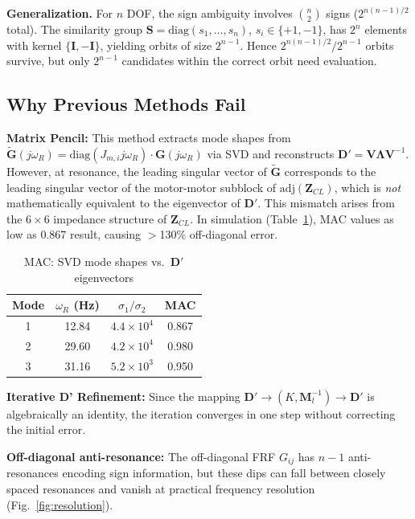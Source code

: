 \documentclass[10pt,twocolumn]{article}
\newcommand{\diag}{\mathrm{diag}}
\begin{document}
\noindent\textbf{Generalization.} For $n$ DOF, the sign ambiguity involves $\binom{n}{2}$ signs ($2^{n(n-1)/2}$ total). The similarity group $\bm{S} = \diag(s_1,\ldots,s_n)$, $s_i \in \{+1,-1\}$, has $2^n$ elements with kernel $\{\bm{I},-\bm{I}\}$, yielding orbits of size $2^{n-1}$. Hence $2^{n(n-1)/2}/2^{n-1}$ orbits survive, but only $2^{n-1}$ candidates within the correct orbit need evaluation.

\subsection{Why Previous Methods Fail}

\textbf{Matrix Pencil:} This method extracts mode shapes from $\tilde{\bm{G}}(j\omega_R) = \diag(J_{m,i} j\omega_R) \cdot \bm{G}(j\omega_R)$ via SVD and reconstructs $\bm{D}' = \bm{V}\bm{\Lambda}\bm{V}^{-1}$. However, at resonance, the leading singular vector of $\tilde{\bm{G}}$ corresponds to the leading singular vector of the motor-motor subblock of $\mathrm{adj}(\bm{Z}_{CL})$, which is \emph{not} mathematically equivalent to the eigenvector of $\bm{D}'$. This mismatch arises from the $6\times 6$ impedance structure of $\bm{Z}_{CL}$.  In simulation (Table~\ref{tab:mac}), MAC values as low as 0.867 result, causing $>$130\% off-diagonal error.

\begin{table}[ht]
\centering
\caption{MAC: SVD mode shapes vs.\ $\bm{D}'$ eigenvectors}
\label{tab:mac}
\begin{tabular}{cccc}
\toprule
Mode & $\omega_R$ (Hz) & $\sigma_1/\sigma_2$ & MAC \\
\midrule
1 & 12.84 & $4.4\times 10^4$ & 0.867 \\
2 & 29.60 & $4.2\times 10^4$ & 0.980 \\
3 & 31.16 & $5.2\times 10^3$ & 0.950 \\
\bottomrule
\end{tabular}
\end{table}

\textbf{Iterative D' Refinement:} Since the mapping $\bm{D}' \to (K,\bm{M}_l^{-1}) \to \bm{D}'$ is algebraically an identity, the iteration converges in one step without correcting the initial error.

\textbf{Off-diagonal anti-resonance:} The off-diagonal FRF $G_{ij}$ has $n{-}1$ anti-resonances encoding sign information, but these dips can fall between closely spaced resonances and vanish at practical frequency resolution (Fig.~\ref{fig:resolution}).
\end{document}
